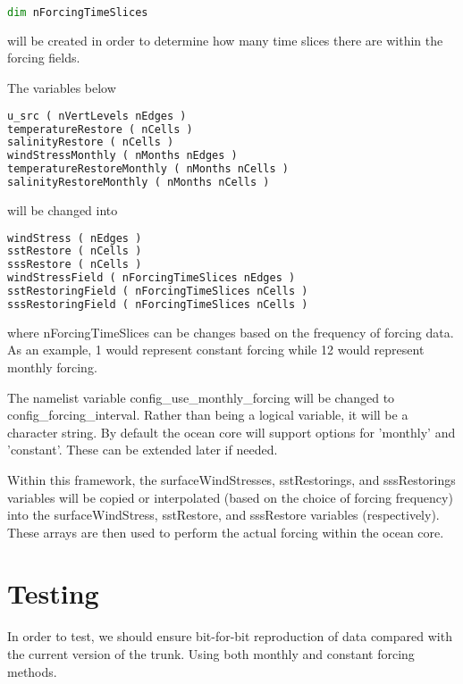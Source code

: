 \documentclass[11pt]{report}
\begin{document}
\begin{lstlisting}[language=fortran,escapechar=@,frame=single]
dim nForcingTimeSlices
\end{lstlisting}
will be created in order to determine how many time slices there are within the
forcing fields.


The variables below
\begin{lstlisting}[language=fortran,escapechar=@,frame=single]
u_src ( nVertLevels nEdges )
temperatureRestore ( nCells )
salinityRestore ( nCells )
windStressMonthly ( nMonths nEdges )
temperatureRestoreMonthly ( nMonths nCells )
salinityRestoreMonthly ( nMonths nCells )
\end{lstlisting}

will be changed into
\begin{lstlisting}[language=fortran,escapechar=@,frame=single]
windStress ( nEdges )
sstRestore ( nCells )
sssRestore ( nCells )
windStressField ( nForcingTimeSlices nEdges )
sstRestoringField ( nForcingTimeSlices nCells )
sssRestoringField ( nForcingTimeSlices nCells )
\end{lstlisting}

where nForcingTimeSlices can be changes based on the frequency of forcing data. As an
example, 1 would represent constant forcing while 12 would represent monthly
forcing.

The namelist variable config\_use\_monthly\_forcing will be changed to
config\_forcing\_interval. Rather than being a logical variable, it will be a
character string. By default the ocean core will support options for 'monthly'
and 'constant'. These can be extended later if needed.

Within this framework, the surfaceWindStresses, sstRestorings, and
sssRestorings variables will be copied or interpolated (based on the choice of
forcing frequency) into the surfaceWindStress, sstRestore, and sssRestore
variables (respectively). These arrays are then used to perform the actual
forcing within the ocean core.


\chapter{Testing}

In order to test, we should ensure bit-for-bit reproduction of data compared
with the current version of the trunk. Using both monthly and constant forcing
methods.

\end{document}
